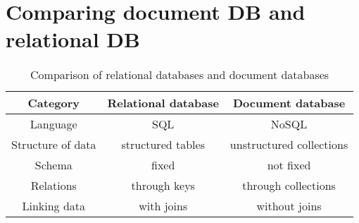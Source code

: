 
\section{Comparing document DB and relational DB}





\begin{table}[H]
    \centering
        \begin{tabular}{c|c|c}
            \textbf{Category} & \textbf{Relational database}    & \textbf{Document database} \\ \hline \hline
            Language          & SQL                             & NoSQL                      \\ \hline
            Structure of data & structured tables               & unstructured collections   \\ \hline
            Schema            & fixed                           & not fixed                  \\ \hline
            Relations         & through keys                    & through collections        \\ \hline
            Linking data      & with joins                      & without joins              \\ \hline
        \end{tabular}
    \caption{Comparison of relational databases and document databases}
    \label{tab:comparison}
\end{table}
\color{black}





